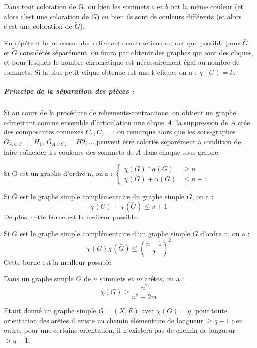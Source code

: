 Dans tout coloration de G, ou bien les sommets $a$ et $b$ ont la même couleur (et
alors c'est une coloration de $\bar G$) ou bien ils sont de couleurs différents (et
alors c'est une coloration de $\tilde G$).

En répétant le processus des reliements-contractions autant que possible pour $\bar G$
et $\tilde G$ considérés séparément, on finira par obtenir des graphes qui sont des cliques,
et pour lesquels le nombre chromatique est nécessairement égal au nombre de sommets.
Si la plus petit clique obtenue est une k-clique, on a : $\chi (G)=k$.

\subparagraph{Principe de la séparation des pièces :}
Si au cours de la procédure de reliements-contractions, on obtient un graphe admettant comme
ensemble d'articulation une clique $A$, la suppression de $A$ crée des composantes connexes
$C_1, C_2,\dots$; on remarque alors que les sous-graphes $G_{A \cup C_1}= H_1$, $G_{A \cup C_2}=H2,\dots$
peuvent être coloriés séparément à condition de faire coïncider les couleurs des sommets de $A$
dans chaque sous-graphe.

\begin{theorem}
Si G est un graphe d'ordre n, on a :
\begin{math}
\begin{cases}
\chi(G) * \alpha(G) & \geq n \\
\chi(G) + \alpha(G) & \leq n + 1
\end{cases}
\end{math}
\end{theorem}

\begin{theorem}
Si $\bar G$ est le graphe simple complémentaire du graphe simple $G$, on a :
$$\chi(G)+\chi(\bar G) \leq n+1$$
De plus, cette borne est la meilleur possible.
\end{theorem}

\begin{corollaire}
Si $\bar G$ est le graphe simple complémentaire d'un graphe simple $G$ d'ordre n, on a :
$$\chi(G)\chi(\bar G)\leq \left(\frac{n+1}{2}\right)^2$$
Cette borne est la meilleur possible.
\end{corollaire}

\begin{theorem}
Dans un graphe simple $G$ de $n$ sommets et $m$ arêtes, on a :
$$\chi(G) \geq \frac{n^2}{n^2-2m}$$
\end{theorem}

\begin{theorem}\label{Roy}
Etant donné un graphe simple $G=(X,E)$ avec $\chi(G)=q$, pour toute orientation des arêtes
il existe un chemin élémentaire de longueur $\geq q-1$ ; en outre, pour une certaine orientation,
il n'existera pas de chemin de longueur $> q-1$.
\end{theorem}

